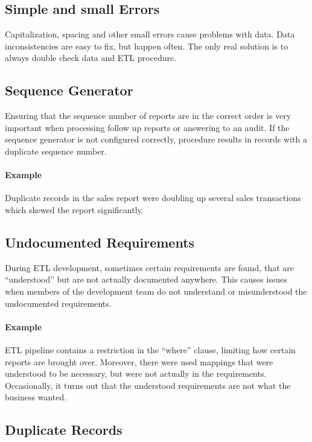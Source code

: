 \subsection*{Simple and small Errors}

Capitalization, spacing and other small errors cause problems with data.
Data inconsistencies are easy to fix, but happen often.
The only real solution is to always double check data and ETL procedure.

\subsection*{Sequence Generator}

Ensuring that the sequence number of reports are in the correct order is very important when processing follow up reports or answering to an audit.
If the sequence generator is not configured correctly, procedure results in records with a duplicate sequence number.

\paragraph*{Example} Duplicate records in the sales report were doubling up several sales transactions which skewed the report significantly.

\subsection*{Undocumented Requirements}

During ETL development, sometimes certain requirements are found, that are \enquote{understood} but are not actually documented anywhere.
This causes issues when members of the development team do not understand or misunderstood the undocumented requirements.

\paragraph*{Example} ETL pipeline contains a restriction in the \enquote{where} clause, limiting how certain reports are brought over.
Moreover, there were used mappings that were understood to be necessary, but were not actually in the requirements.
Occasionally, it turns out that the understood requirements are not what the business wanted.

\subsection*{Duplicate Records}

